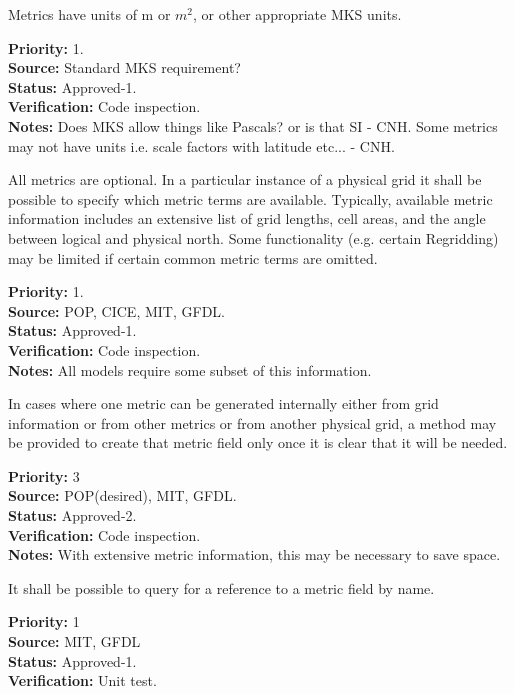 Metrics have units of m or $m^2$, or other appropriate MKS units.
\begin{reqlist}
{\bf Priority:} 1. \\
{\bf Source:} Standard MKS requirement? \\
{\bf Status:} Approved-1. \\
{\bf Verification:} Code inspection. \\
{\bf Notes:} Does MKS allow things like Pascals? or is that SI - CNH.
Some metrics may not have units i.e. scale factors with latitude etc... - CNH.
\end{reqlist}

All metrics are optional.  In a particular instance of a physical grid it shall be
possible to specify which metric terms are available.  Typically, available
metric information includes an extensive list of grid lengths, cell areas, and
the angle between logical and physical north.  Some functionality (e.g. certain
Regridding) may be limited if certain common metric terms are omitted.
\begin{reqlist}
{\bf Priority:} 1. \\
{\bf Source:} POP, CICE, MIT, GFDL. \\
{\bf Status:} Approved-1. \\
{\bf Verification:} Code inspection. \\
{\bf Notes:} All models require some subset of this information.
\end{reqlist}

In cases where one metric can be generated internally either from grid information
or from other metrics or from another physical grid, a method may be provided to create
that metric field only once it is clear that it will be needed.
\begin{reqlist}
{\bf Priority:} 3 \\
{\bf Source:} POP(desired), MIT, GFDL. \\
{\bf Status:} Approved-2. \\
{\bf Verification:} Code inspection. \\
{\bf Notes:} With extensive metric information, this may be necessary to save space.
\end{reqlist}

It shall be possible to query for a reference to a metric field by name.
\begin{reqlist}
{\bf Priority:} 1 \\
{\bf Source:} MIT, GFDL \\
{\bf Status:} Approved-1. \\
{\bf Verification:} Unit test.
\end{reqlist}

